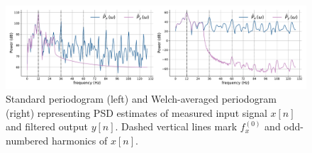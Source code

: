 \begin{figure}[!htb]
    \centering
    \includegraphics[width=\textwidth]{sq_wave_filtering_spectra}
    \caption[PSD estimates of a measured input signal and its filtered output]{Standard periodogram (left) and Welch-averaged periodogram (right) representing PSD estimates of measured input signal $x[n]$ and filtered output $y[n]$. Dashed vertical lines mark $f_x^{(0)}$ and odd-numbered harmonics of $x[n]$.}
    \label{fig:sq-wave-spectra-c6}
\end{figure}

